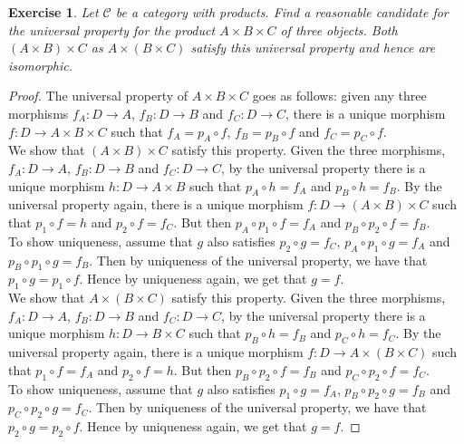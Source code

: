 \documentclass[a4paper, 11pt]{book}
\theoremstyle{plain}
\newtheorem{exercise}[theorem]{Exercise}
\theoremstyle{plain}
\begin{document}
\begin{exercise}
Let $\mathcal{C}$ be a category with products. Find a reasonable candidate for the universal property for the product $A\times B\times C$ of three objects. Both $(A\times B)\times C$ as $A\times (B\times C)$ satisfy this universal property and hence are isomorphic.
\end{exercise}
\begin{proof}
The universal property of $A\times B\times C$ goes as follows: given any three morphisms $f_A:D\rightarrow A$, $f_B:D\rightarrow B$ and $f_C:D\rightarrow C$, there is a unique morphism $f:D\rightarrow A\times B\times C$ such that $f_A = p_A\circ f$, $f_B = p_B\circ f$ and $f_C = p_C\circ f$.\\
We show that $(A\times B)\times C$ satisfy this property. Given the three morphisms, $f_A:D\rightarrow A$, $f_B:D\rightarrow B$ and $f_C:D\rightarrow C$, by the universal property there is a unique  morphism $h:D\rightarrow A\times B$ such that $p_A\circ h = f_A$ and $p_B\circ h = f_B$. By the universal property again, there is a unique morphism $f:D\rightarrow (A\times B)\times C$ such that $p_1\circ f = h$ and $p_2\circ f = f_C$. But then $p_A\circ p_1\circ f = f_A$ and $p_B\circ p_2\circ f = f_B$.\\
To show uniqueness, assume that $g$ also satisfies $p_2\circ g = f_C$, $p_A\circ p_1\circ g = f_A$ and $p_B\circ p_1\circ g = f_B$. Then by uniqueness of the universal property, we have that $p_1\circ g = p_1\circ f$. Hence by uniqueness again, we get that $g=f$.\\
We show that $A\times (B\times C)$ satisfy this property. Given the three morphisms, $f_A:D\rightarrow A$, $f_B:D\rightarrow B$ and $f_C:D\rightarrow C$, by the universal property there is a unique  morphism $h:D\rightarrow B\times C$ such that $p_B\circ h = f_B$ and $p_C\circ h = f_C$. By the universal property again, there is a unique morphism $f:D\rightarrow A\times (B\times C)$ such that $p_1\circ f = f_A$ and $p_2\circ f = h$. But then $p_B\circ p_2\circ f = f_B$ and $p_C\circ p_2\circ f = f_C$.\\
To show uniqueness, assume that $g$ also satisfies $p_1\circ g = f_A$, $p_B\circ p_2\circ g = f_B$ and $p_C\circ p_2\circ g = f_C$. Then by uniqueness of the universal property, we have that $p_2\circ g = p_2\circ f$. Hence by uniqueness again, we get that $g=f$.
\end{proof}
\end{document}
